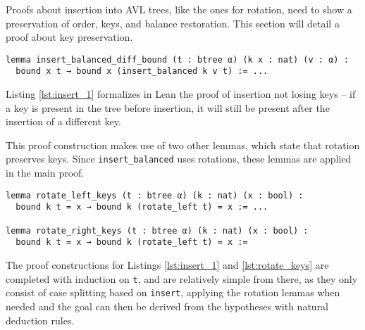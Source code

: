 Proofs about insertion into AVL trees, like the ones for rotation, need to show a preservation of order, keys, and balance restoration. This section will detail a proof about key preservation. 

\begin{lstlisting}[caption=\empty, label={lst:insert_1}]
lemma insert_balanced_diff_bound (t : btree α) (k x : nat) (v : α) :
  bound x t → bound x (insert_balanced k v t) := ...
\end{lstlisting}

Listing \ref{lst:insert_1} formalizes in Lean the proof of insertion not losing keys -- if a key is present in the tree before insertion, it will still be present after the insertion of a different key.

This proof construction makes use of two other lemmas, which state that rotation preserves keys. Since \lstinline{insert_balanced} uses rotations, these lemmas are applied in the main proof.

\begin{lstlisting}[caption=\empty, label={lst:rotate_keys}]
lemma rotate_left_keys (t : btree α) (k : nat) (x : bool) :
  bound k t = x → bound k (rotate_left t) = x := ...

lemma rotate_right_keys (t : btree α) (k : nat) (x : bool) :
  bound k t = x → bound k (rotate_left t) = x :=
\end{lstlisting}

The proof constructions for Listings \ref{lst:insert_1} and \ref{lst:rotate_keys} are completed with induction on \lstinline{t}, and are relatively simple from there, as they only consist of case splitting based on \lstinline{insert}, applying the rotation lemmas when needed and the goal can then be derived from the hypotheses with natural deduction rules. 